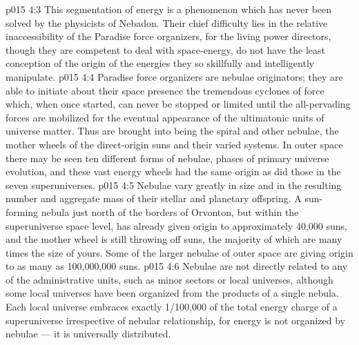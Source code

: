 \vs p015 4:3 This segmentation of energy is a phenomenon which has never been solved by the physicists of Nebadon. Their chief difficulty lies in the relative inaccessibility of the Paradise force organizers, for the living power directors, though they are competent to deal with space\hyp{}energy, do not have the least conception of the origin of the energies they so skillfully and intelligently manipulate.
\vs p015 4:4 \pc Paradise force organizers are nebulae originators; they are able to initiate about their space presence the tremendous cyclones of force which, when once started, can never be stopped or limited until the all\hyp{}pervading forces are mobilized for the eventual appearance of the ultimatonic units of universe matter. Thus are brought into being the spiral and other nebulae, the mother wheels of the direct\hyp{}origin suns and their varied systems. In outer space there may be seen ten different forms of nebulae, phases of primary universe evolution, and these vast energy wheels had the same origin as did those in the seven superuniverses.
\vs p015 4:5 \pc Nebulae vary greatly in size and in the resulting number and aggregate mass of their stellar and planetary offspring. A sun\hyp{}forming nebula just north of the borders of Orvonton, but within the superuniverse space level, has already given origin to approximately 40,000 suns, and the mother wheel is still throwing off suns, the majority of which are many times the size of yours. Some of the larger nebulae of outer space are giving origin to as many as 100,000,000 suns.
\vs p015 4:6 Nebulae are not directly related to any of the administrative units, such as minor sectors or local universes, although some local universes have been organized from the products of a single nebula. Each local universe embraces exactly 1/100,000 of the total energy charge of a superuniverse irrespective of nebular relationship, for energy is not organized by nebulae --- it is universally distributed.

